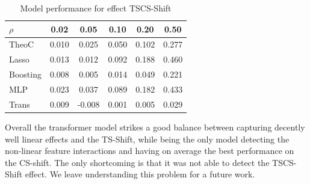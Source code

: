 \documentclass{article}
\begin{document}
\begin{table}[t]\label{table_tscs_shift}
    \centering
    \begin{tabular}{lccccc}
\toprule
$\rho$ & 0.02 & 0.05 & 0.10 & 0.20 & 0.50 \\
\midrule
TheoC & {\cellcolor[HTML]{6485EC}} \color[HTML]{F1F1F1} 0.010 & {\cellcolor[HTML]{F5A081}} \color[HTML]{000000} 0.025 & {\cellcolor[HTML]{E6D7CF}} \color[HTML]{000000} 0.050 & {\cellcolor[HTML]{E4D9D2}} \color[HTML]{000000} 0.102 & {\cellcolor[HTML]{EED0C0}} \color[HTML]{000000} 0.277 \\
Lasso & {\cellcolor[HTML]{AAC7FD}} \color[HTML]{000000} 0.013 & {\cellcolor[HTML]{CDD9EC}} \color[HTML]{000000} 0.012 & {\cellcolor[HTML]{B40426}} \color[HTML]{F1F1F1} 0.092 & {\cellcolor[HTML]{B40426}} \color[HTML]{F1F1F1} 0.188 & {\cellcolor[HTML]{B40426}} \color[HTML]{F1F1F1} 0.460 \\
Boosting & {\cellcolor[HTML]{3B4CC0}} \color[HTML]{F1F1F1} 0.008 & {\cellcolor[HTML]{9ABBFF}} \color[HTML]{000000} 0.005 & {\cellcolor[HTML]{6788EE}} \color[HTML]{F1F1F1} 0.014 & {\cellcolor[HTML]{89ACFD}} \color[HTML]{000000} 0.049 & {\cellcolor[HTML]{CEDAEB}} \color[HTML]{000000} 0.221 \\
MLP & {\cellcolor[HTML]{B40426}} \color[HTML]{F1F1F1} 0.023 & {\cellcolor[HTML]{B40426}} \color[HTML]{F1F1F1} 0.037 & {\cellcolor[HTML]{C0282F}} \color[HTML]{F1F1F1} 0.089 & {\cellcolor[HTML]{C0282F}} \color[HTML]{F1F1F1} 0.182 & {\cellcolor[HTML]{CB3E38}} \color[HTML]{F1F1F1} 0.433 \\
Trans & {\cellcolor[HTML]{4F69D9}} \color[HTML]{F1F1F1} 0.009 & {\cellcolor[HTML]{3B4CC0}} \color[HTML]{F1F1F1} -0.008 & {\cellcolor[HTML]{3B4CC0}} \color[HTML]{F1F1F1} 0.001 & {\cellcolor[HTML]{3B4CC0}} \color[HTML]{F1F1F1} 0.005 & {\cellcolor[HTML]{3B4CC0}} \color[HTML]{F1F1F1} 0.029 \\
\bottomrule
\end{tabular}
\vskip 0.05in
\caption{Model performance for effect TSCS-Shift}
    \label{table_tscs_shift}
    \end{table}


Overall the transformer model strikes a good balance between capturing decently well linear effects and the TS-Shift, while being the only model detecting the non-linear feature interactions and having on average the best performance on the CS-shift. The only shortcoming is that it was not able to detect the TSCS-Shift effect. We leave understanding this problem for a future work.
\end{document}
